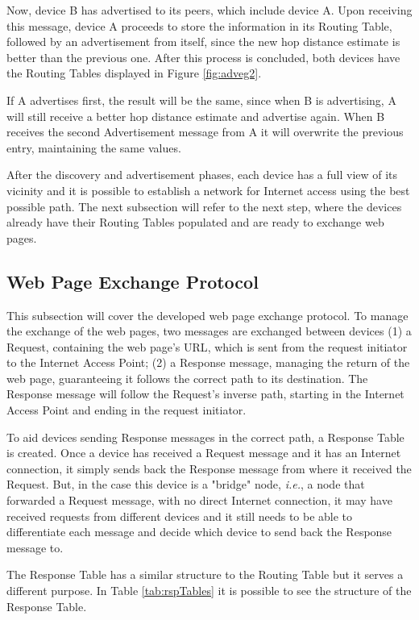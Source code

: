 Now, device B has advertised to its peers, which include device A. Upon receiving this message, device A proceeds to store the information in its Routing Table, followed by an advertisement from itself, since the new hop distance estimate is better than the previous one. After this process is concluded, both devices have the Routing Tables displayed in Figure \ref{fig:adveg2}.

If A advertises first, the result will be the same, since when B is advertising, A will still receive a better hop distance estimate and advertise again. When B receives the second Advertisement message from A it will overwrite the previous entry, maintaining the same values.

After the discovery and advertisement phases, each device has a full view of its vicinity and it is possible to establish a network for Internet access using the best possible path. The next subsection will refer to the next step, where the devices already have their Routing Tables populated and are ready to exchange web pages.

\subsection{Web Page Exchange Protocol}
\label{subsec:exch}

This subsection will cover the developed web page exchange protocol. To manage the exchange of the web pages, two messages are exchanged between devices (1) a Request, containing the web page's \gls{URL}, which is sent from the request initiator to the Internet Access Point; (2) a Response message, managing the return of the web page, guaranteeing it follows the correct path to its destination. The Response message will follow the Request's inverse path, starting in the Internet Access Point and ending in the request initiator.

To aid devices sending Response messages in the correct path, a Response Table is created. Once a device has received a Request message and it has an Internet connection, it simply sends back the Response message from where it received the Request. But, in the case this device is a "bridge" node, \textit{i.e.}, a node that forwarded a Request message, with no direct Internet connection, it may have received requests from different devices and it still needs to be able to differentiate each message and decide which device to send back the Response message to.

The Response Table has a similar structure to the Routing Table but it serves a different purpose. In Table \ref{tab:rspTables} it is possible to see the structure of the Response Table.

